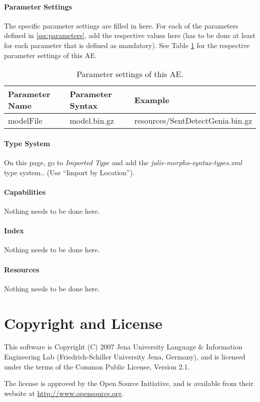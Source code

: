 \documentclass[11pt,a4paper,halfparskip]{scrartcl}
\begin{document}
\paragraph{Parameter Settings}
\label{sss:param_settings}

The specific parameter settings are filled in here. For each of the
parameters defined in \ref{sss:parameters}, add the respective values
here (has to be done at least for each parameter that is defined as
mandatory). See Table \ref{tab:param_settings} for the respective
parameter settings of this AE.

\begin{table}[h!]
  \centering
  \begin{tabular}{|p{4cm}|p{4cm}|p{7cm}|}
    \hline
    Parameter Name & Parameter Syntax & Example \\
    \hline\hline
    modelFile & model.bin.gz & resources/SentDetectGenia.bin.gz\\
  \hline
  \end{tabular}
  \caption{Parameter settings of this AE.}
  \label{tab:param_settings}
\end{table}

\paragraph{Type System}
\label{sss:type_system}
On this page, go to \emph{Imported Type} and add the \emph{julie-morpho-syntax-types.xml} type system.. (Use ``Import by Location'').


\paragraph{Capabilities}
Nothing needs to be done here.


\paragraph{Index}
Nothing needs to be done here.

\paragraph{Resources}
Nothing needs to be done here.


\section{Copyright and License}
This software is Copyright (C) 2007 Jena University Language \& Information
Engineering Lab (Friedrich-Schiller University Jena, Germany), and is
licensed under the terms of the Common Public License, Version 2.1.

The license is approved by the Open Source Initiative, and is
available from their website at \url{http://www.opensource.org}.



\end{document}
